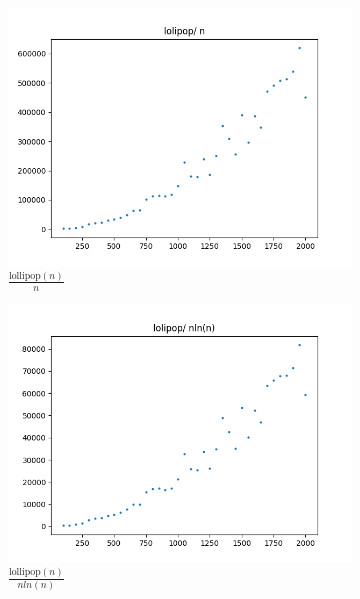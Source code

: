 \documentclass{article}
\begin{document}
\begin{figure}[H]
  \centering
  \begin{subfigure}{.475\textwidth}
    \centering
    \includegraphics[width=\textwidth]{lollipop_n.png}
    \caption{\( \frac{\text{lollipop}(n)}{n} \)}
    \label{fig:lollipop_n}
  \end{subfigure}%
  \begin{subfigure}{.475\textwidth}
    \centering
    \includegraphics[width=\textwidth]{lollipop_nlnn.png}
    \caption{\( \frac{\text{lollipop}(n)}{nln(n)} \)}
    \label{fig:lollipop_nlnn}
  \end{subfigure}%
  \hfill
  \begin{subfigure}{.475\textwidth}
    \centering

\end{subfigure}
\end{figure}
\end{document}
